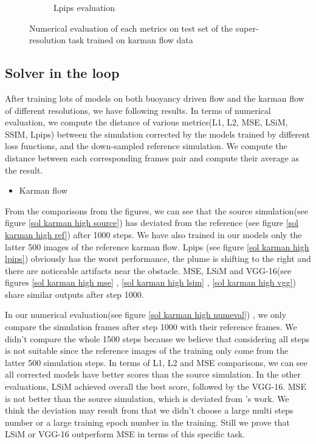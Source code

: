 \documentclass[a4paper,12pt,twoside]{report}
\begin{document}
\begin{figure}
\begin{subfigure}{0.32\textwidth}
		\caption{Lpips evaluation}
	\end{subfigure}
	\caption{Numerical evaluation of each metrics on test set of the super-resolution task trained on karman flow data}
	\label{super karman numeval}
\end{figure}

\subsection{Solver in the loop}
After training lots of models on both buoyancy driven flow and the karman flow of different resolutions, we have following results. In terms of numerical evaluation, we compute the distance of various metrics(L1, L2, MSE, LSiM, SSIM, Lpips) between the simulation corrected by the models trained by different loss functions, and the down-sampled reference simulation. We compute the distance between each corresponding frames pair and compute their average as the result.
\begin{itemize}
  \item Karman flow
\end{itemize}
From the comparisons from the figures, we can see that the source simulation(see figure \ref{sol karman high source}) has deviated from the reference (see figure \ref{sol karman high ref}) after 1000 steps. We have also trained in our models only the latter 500 images of the reference karman flow. Lpips (see figure \ref{sol karman high lpips}) obviously has the worst performance, the plume is shifting to the right and there are noticeable artifacts near the obstacle. MSE, LSiM and VGG-16(see figures \ref{sol karman high mse} , \ref{sol karman high lsim} , \ref{sol karman high vgg})  share similar outputs after step 1000.

In our numerical evaluation(see figure \ref{sol karman high numeval}) , we only compare the simulation frames after step 1000 with their reference frames. We didn't compare the whole 1500 steps because we believe that considering all steps is not suitable since the reference images of the training only come from the latter 500 simulation steps. In terms of L1, L2 and MSE comparisons, we can see all corrected models have better scores than the source simulation. In the other evaluations, LSiM achieved overall the best score, followed by the VGG-16. MSE is not better than the source simulation, which is deviated from \citeauthor{um2020sol}'s work. We think the deviation may result from that we didn't choose a large multi steps number or a large training epoch number in the training. Still we prove that LSiM or VGG-16 outperform MSE in terms of this specific task.
\end{document}
